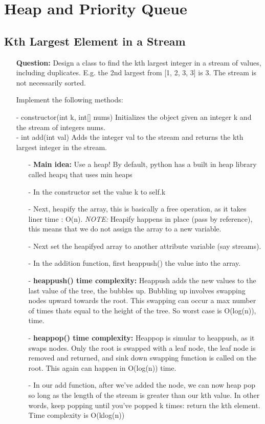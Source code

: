 \documentclass[12pt]{article}
\begin{document}
\section{Heap and Priority Queue}

\subsection{Kth Largest Element in a Stream}
\begin{enumerate}
  \item[] \textbf{Question:} 
    Design a class to find the kth largest integer in a stream of values, including duplicates. E.g. the 2nd largest from [1, 2, 3, 3] is 3. The stream is not necessarily sorted.

Implement the following methods:

 - constructor(int k, int[] nums) Initializes the object given an integer k and the stream of integers nums.\\
 - int add(int val) Adds the integer val to the stream and returns the kth largest integer in the stream.



    \begin{enumerate}
      \item[-] \textbf{Main idea:} Use a heap! By default, python has a built in heap library called heapq that uses min heaps
      \item[-] In the constructor set the value k to self.k 
      \item[-] Next, heapify the array, this is basically a free operation, as it takes liner time : O(n). \textit{NOTE:} Heapify happens in place (pass by reference), this means that we do not assign the array to a new variable. 
      \item[-] Next set the heapifyed array to another attribute variable (say streams).
      \item[-] In the addition function, first heappush() the value into the array. 
      \item[-] \textbf{heappush() time complexity: } Heappush adds the new values to the last value of the tree, the bubbles up. Bubbling up involves swapping nodes upward towards the root. This swapping can occur a max number of times thats equal to the height of the tree. So worst case is O(log(n)), time.
      \item[-] \textbf{heappop() time complexity: } Heappop is simular to heappush, as it swaps nodes. Only the root is swapped with a leaf node, the leaf node is removed and returned, and sink down swapping function is called on the root. This again can happen in O(log(n)) time. 
      \item[-] In our add function, after we've added the node, we can now heap pop so long as the length of the stream is greater than our kth value. In other words, keep popping until you've popped k times: return the kth element. Time complexity is O(klog(n))
    \end{enumerate}
\end{enumerate}
\end{document}
